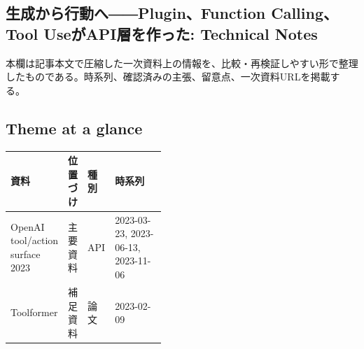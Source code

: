 \subsection*{生成から行動へ――Plugin、Function Calling、Tool UseがAPI層を作った: Technical Notes}
本欄は記事本文で圧縮した一次資料上の情報を、比較・再検証しやすい形で整理したものである。時系列、確認済みの主張、留意点、一次資料URLを掲載する。
\smallskip
{}\par
\medskip
\subsection*{Theme at a glance}
\begin{center}
\footnotesize
\begin{tabularx}{\linewidth}{@{}p{0.20\linewidth}p{0.10\linewidth}p{0.14\linewidth}X@{}}
\toprule
資料 & 位置づけ & 種別 & 時系列 \\
\midrule
OpenAI tool/action surface 2023 & 主要資料 & API & 2023-03-23, 2023-06-13, 2023-11-06 \\
Toolformer & 補足資料 & 論文 & 2023-02-09 \\
\bottomrule
\end{tabularx}
\end{center}
\normalsize

